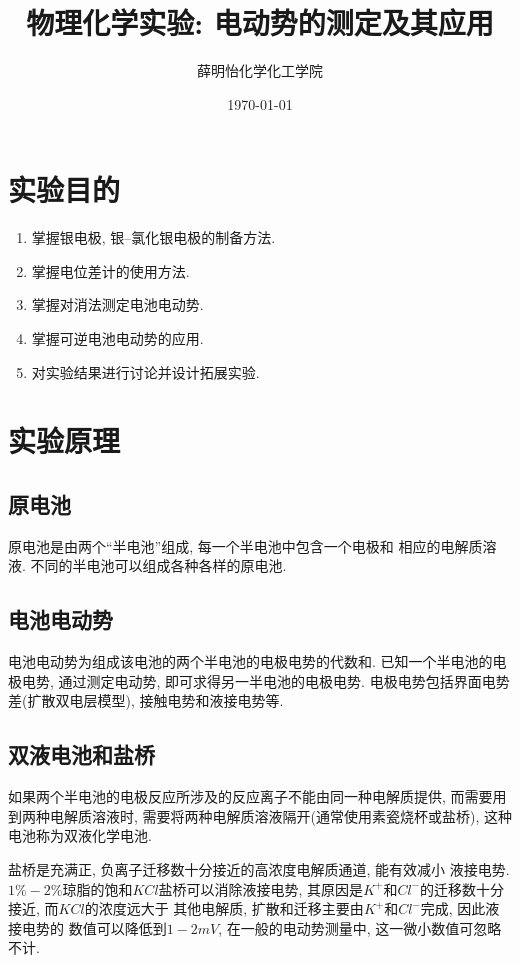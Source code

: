 \documentclass[a4paper]{article}
\title{物理化学实验: 电动势的测定及其应用}
\author{薛明怡\quad 151250177\quad 化学化工学院}
\date{\today}
\begin{document}
\maketitle
\section{实验目的}
\begin{enumerate}
\item 掌握银电极, 银--氯化银电极的制备方法.
\item 掌握电位差计的使用方法.
\item 掌握对消法测定电池电动势.
\item 掌握可逆电池电动势的应用.
\item 对实验结果进行讨论并设计拓展实验.
\end{enumerate}
\section{实验原理}
\subsection{原电池}
原电池是由两个``半电池''组成, 每一个半电池中包含一个电极和
相应的电解质溶液. 不同的半电池可以组成各种各样的原电池.
\par
\subsection{电池电动势}
电池电动势为组成该电池的两个半电池的电极电势的代数和. 
已知一个半电池的电极电势, 通过测定电动势, 即可求得另一半电池的电极电势.
电极电势包括界面电势差(扩散双电层模型), 接触电势和液接电势等.
\subsection{双液电池和盐桥}
如果两个半电池的电极反应所涉及的反应离子不能由同一种电解质提供, 
而需要用到两种电解质溶液时, 需要将两种电解质溶液隔开(通常使用素瓷烧杯或盐桥), 
这种电池称为双液化学电池.
\par 
盐桥是充满正, 负离子迁移数十分接近的高浓度电解质通道, 能有效减小
液接电势. $1\% - 2\%$琼脂的饱和$KCl$盐桥可以消除液接电势, 
其原因是$K^{+}$和$Cl^{-}$的迁移数十分接近, 而$KCl$的浓度远大于
其他电解质, 扩散和迁移主要由$K^{+}$和$Cl^{-}$完成, 因此液接电势的
数值可以降低到$1 - 2mV$, 在一般的电动势测量中, 这一微小数值可忽略不计.
\end{document}

